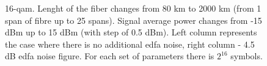 \begin{figure}[htpb]
    \begin{minipage}[h]{0.5\linewidth}
    \end{minipage}
    \hfill
    \begin{minipage}[h]{0.5\linewidth}
    \end{minipage}
    \caption{16-\acrshort{qam}. Lenght of the fiber changes from 80 km to 2000 km (from 1 span of fibre up to 25 spans). Signal average power changes from -15 dBm up to 15 dBm (with step of 0.5 dBm). Left column represents the case where there is no additional \acrshort{edfa} noise, right column - 4.5 dB \acrshort{edfa} noise figure. For each set of parameters there is $2^{16}$ symbols.}
    \label{fig:hpcom_example1}
\end{figure}



